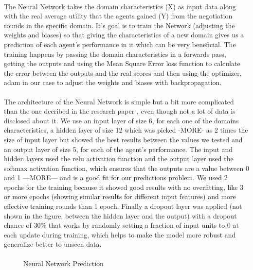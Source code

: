 \paragraph{}
 The Neural Network takes the domain characteristics (X) as input data along with the real average utility that the agents gained (Y) from the negotiation rounds in the specific domain. It’s goal is to train the Network (adjusting the weights and biases) so that giving the characteristics of a new domain gives us a prediction of each agent’s performance in it which can be very beneficial.  
 The training happens by passing the domain characteristics in a forwards pass, getting the outputs and using the Mean Square Error loss function to calculate the error between the outputs and the real scores and then using the optimizer, adam in our case to adjust the weights and biases with backpropagation.
 \paragraph{}

The architecture of the Neural Network is simple but a bit more complicated than the one decribed in the research paper \cite{meta_agent_paper}, even though not a lot of data is disclosed about it.
 We use an input layer of size 6, for each one of the domains characteristics, 
 a hidden layer of size 12 which was picked -MORE- as 2 times the size of input layer but showed 
 the best results between the values we tested and an output layer of size 5, for each of the agent's performance.  
 The input and hidden layers used the relu activation function and the output layer used the softmax activation function, which ensures that the outputs are a value between 0 and 1 —MORE— and is a good fit for our predictions problem. We used 2 epochs for the training because it showed good results with no overfitting, like 3 or more epochs (showing similar results for different input features) and
  more effective training rounds than 1 epoch. Finally a dropout layer was applied (not shown in the figure, between the hidden layer and the output) with a dropout chance of 30\% that works by 
  randomly setting a fraction of input units to 0 at each update during training, which helps to make the model more robust and generalize better to unseen data. 
\paragraph{}


\begin{figure}[H]
\centering
{}
\captionsetup{justification=centering}
\caption{Neural Network Prediction}
\label{fig:Neural Network Prediction}
\end{figure}

